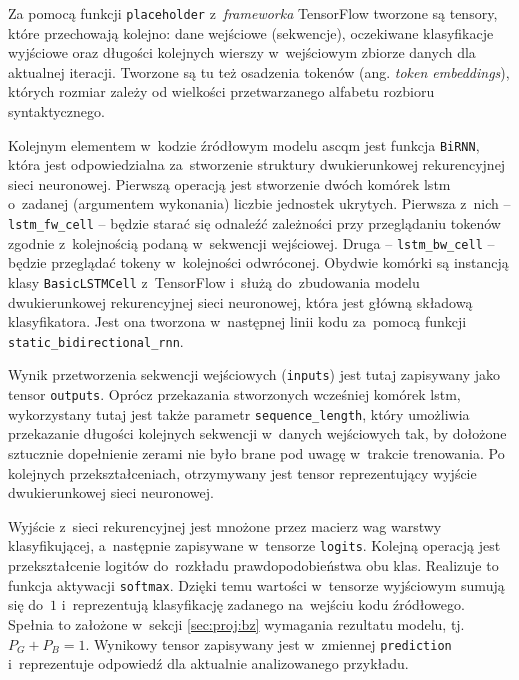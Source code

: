 \documentclass[twoside]{praca}
\begin{document}
Za pomocą funkcji \texttt{placeholder} z~\textit{frameworka} TensorFlow tworzone są tensory, które przechowają kolejno: dane wejściowe (sekwencje), oczekiwane klasyfikacje wyjściowe oraz długości kolejnych wierszy w~wejściowym zbiorze danych dla aktualnej iteracji. Tworzone są tu też osadzenia tokenów (ang. \textit{token embeddings}), których rozmiar zależy od wielkości przetwarzanego alfabetu rozbioru syntaktycznego.

Kolejnym elementem w~kodzie źródłowym modelu \gls{ascqm} jest funkcja \texttt{BiRNN}, która jest odpowiedzialna za~stworzenie struktury dwukierunkowej rekurencyjnej sieci neuronowej. Pierwszą operacją jest stworzenie dwóch komórek \gls{lstm} o~zadanej (argumentem wykonania) liczbie jednostek ukrytych. Pierwsza z~nich -- \texttt{lstm\_fw\_cell} -- będzie starać się odnaleźć zależności przy przeglądaniu tokenów zgodnie z~kolejnością podaną w~sekwencji wejściowej. Druga -- \texttt{lstm\_bw\_cell} -- będzie przeglądać tokeny w~kolejności odwróconej. Obydwie komórki są instancją klasy \texttt{BasicLSTMCell} z~TensorFlow i~służą do~zbudowania modelu dwukierunkowej rekurencyjnej sieci neuronowej, która jest główną składową klasyfikatora. Jest ona tworzona w~następnej linii kodu za~pomocą funkcji \texttt{static\_bidirectional\_rnn}. 

Wynik przetworzenia sekwencji wejściowych (\texttt{inputs}) jest tutaj zapisywany jako tensor \texttt{outputs}. Oprócz przekazania stworzonych wcześniej komórek \gls{lstm}, wykorzystany tutaj jest także parametr \texttt{sequence\_length}, który umożliwia przekazanie długości kolejnych sekwencji w~danych wejściowych tak, by dołożone sztucznie dopełnienie zerami nie było brane pod uwagę w~trakcie trenowania. Po kolejnych przekształceniach, otrzymywany jest tensor reprezentujący wyjście dwukierunkowej sieci neuronowej. 

Wyjście z~sieci rekurencyjnej jest mnożone przez macierz wag warstwy klasyfikującej, a~następnie zapisywane w~tensorze \texttt{logits}. Kolejną operacją jest przekształcenie logitów do~rozkładu prawdopodobieństwa obu klas. Realizuje to funkcja aktywacji \texttt{softmax}. Dzięki temu wartości w~tensorze wyjściowym sumują się do~$1$ i~reprezentują klasyfikację zadanego na~wejściu kodu źródłowego. Spełnia to założone w~sekcji \ref{sec:proj:bz} wymagania rezultatu modelu, tj. $P_G+P_B=1$. Wynikowy tensor zapisywany jest w~zmiennej \texttt{prediction} i~reprezentuje odpowiedź dla aktualnie analizowanego przykładu.
\end{document}

